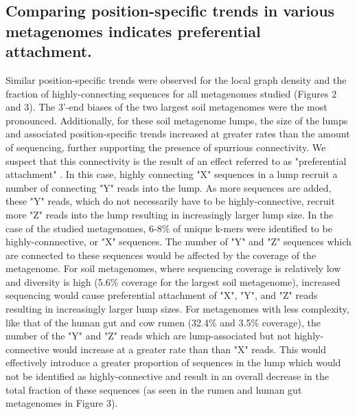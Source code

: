 \documentclass[11pt]{article} %
\begin{document}
\subsection{Comparing position-specific trends in various metagenomes indicates preferential attachment.}
Similar position-specific trends were observed for the local graph density and the fraction of highly-connecting sequences for all metagenomes studied (Figures 2 and 3).  The 3'-end biases of the two largest soil metagenomes were the most pronounced.  Additionally, for these soil metagenome lumps, the size of the lumps and associated position-specific trends increased at greater rates than the amount of sequencing, further supporting the presence of spurrious connectivity.  We suspect that this connectivity is the result of an effect referred to as "preferential attachment" \cite{Barabasi:1999p1083}. In this case, highly connecting "X" sequences in a lump recruit a number of connecting "Y" reads into the lump.  As more sequences are added, these "Y" reads, which do not necessarily have to be highly-connective, recruit more "Z" reads into the lump resulting in increasingly larger lump size.  In the case of the studied metagenomes, 6-8\% of unique k-mers were identified to be highly-connnective, or "X" sequences.  The number of "Y" and "Z" sequences which are connected to these sequences would be affected by the coverage of the metagenome.  For soil metagenomes, where sequencing coverage is relatively low and diversity is high (5.6\% coverage for the largest soil metagenome), increased sequencing would cause preferential attachment of "X", "Y", and "Z" reads resulting in increasingly larger lump sizes.  For metagenomes with less complexity, like that of the human gut and cow rumen (32.4\% and 3.5\% coverage), the number of the "Y" and "Z" reads which are lump-associated but not highly-connective would increase at a greater rate than than "X" reads.   This would effectively introduce a greater proportion of sequences in the lump which would not be identified as highly-connective and result in an overall decrease in the total fraction of these sequences (as seen in the rumen and human gut metagenomes in Figure 3).  
\end{document}
